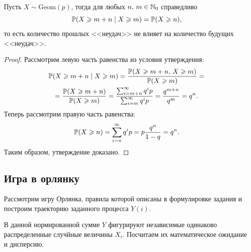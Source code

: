 \begin{assertion}
        Пусть $X\sim\mbox{Geom}(p)$, тогда для любых $n,\,m\in\mathbb{N}_0$ справедливо
        $$
                \mathbb{P}(X \geqslant m + n\;|\;X\geqslant m) = \mathbb{P}(X\geqslant n),
        $$
        то есть количество прошлых <<неудач>> не влияет на количество будущих <<неудач>>.
\end{assertion}
\begin{proof}
        Рассмотрим левую часть равенства из условия утверждения:
        \begin{multline*}
                \mathbb{P}(X \geqslant m+n\;|\;X\geqslant m)=
                \frac{\mathbb{P}(X\geqslant m + n,\,X\geqslant m)}{\mathbb{P}(X\geqslant m)}=\\
                =\frac{\mathbb{P}(X\geqslant m+ n)}{\mathbb{P}(X\geqslant m)}=
                \frac{\sum_{i=m+n}^{\infty}q^ip}{\sum_{i=m}^{\infty}q^ip}=
                \frac{q^{m+n}}{q^m}=
                q^n.
        \end{multline*}
        Теперь рассмотрим правую часть равенства:
        $$
                \mathbb{P}(X\geqslant n) = \sum_{i=n}^{\infty}q^ip =
                p\frac{q^n}{1 - q} = q^n.
        $$
        Таким образом, утверждение доказано.
\end{proof}

\subsection{Игра в орлянку}

Рассмотрим игру Орлянка, правила которой описаны в формулировке задания и построим траекторию заданного процесса $Y(i)$.


В данной нормированной сумме $Y$ фигурируют независимые одинаково распределенные случйные величины $X_i$.
Посчитаем их математическое ожидание и дисперсию.

